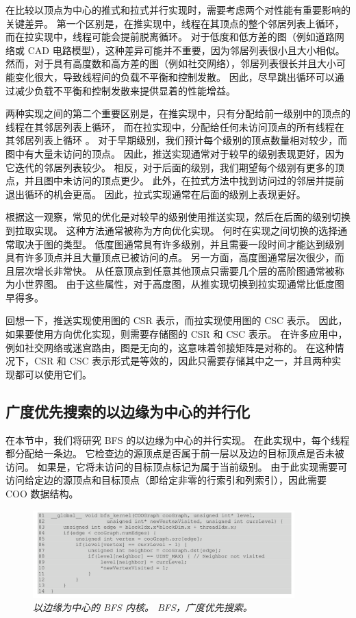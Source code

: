 在比较以顶点为中心的推式和拉式并行实现时，需要考虑两个对性能有重要影响的关键差异。 
第一个区别是，在推实现中，线程在其顶点的整个邻居列表上循环，而在拉实现中，线程可能会提前脱离循环。 
对于低度和低方差的图（例如道路网络或 CAD 电路模型），这种差异可能并不重要，因为邻居列表很小且大小相似。 
然而，对于具有高度数和高方差的图（例如社交网络），邻居列表很长并且大小可能变化很大，导致线程间的负载不平衡和控制发散。 
因此，尽早跳出循环可以通过减少负载不平衡和控制发散来提供显着的性能增益。

两种实现之间的第二个重要区别是，在推实现中，只有分配给前一级别中的顶点的线程在其邻居列表上循环，
而在拉实现中，分配给任何未访问顶点的所有线程在其邻居列表上循环 。 
对于早期级别，我们预计每个级别的顶点数量相对较少，而图中有大量未访问的顶点。 
因此，推送实现通常对于较早的级别表现更好，因为它迭代的邻居列表较少。 
相反，对于后面的级别，我们期望每个级别有更多的顶点，并且图中未访问的顶点更少。 
此外，在拉式方法中找到访问过的邻居并提前退出循环的机会更高。 因此，拉式实现通常在后面的级别上表现更好。

根据这一观察，常见的优化是对较早的级别使用推送实现，然后在后面的级别切换到拉取实现。 这种方法通常被称为方向优化实现。 
何时在实现之间切换的选择通常取决于图的类型。 
低度图通常具有许多级别，并且需要一段时间才能达到级别具有许多顶点并且大量顶点已被访问的点。 
另一方面，高度图通常层次很少，而且层次增长非常快。 从任意顶点到任意其他顶点只需要几个层的高阶图通常被称为小世界图。 
由于这些属性，对于高度图，从推实现切换到拉实现通常比低度图早得多。

回想一下，推送实现使用图的 CSR 表示，而拉实现使用图的 CSC 表示。 
因此，如果要使用方向优化实现，则需要存储图的 CSR 和 CSC 表示。 
在许多应用中，例如社交网络或迷宫路由，图是无向的，这意味着邻接矩阵是对称的。 
在这种情况下，CSR 和 CSC 表示形式是等效的，因此只需要存储其中之一，并且两种实现都可以使用它们。

\subsection{广度优先搜索的以边缘为中心的并行化}
在本节中，我们将研究 BFS 的以边缘为中心的并行实现。 
在此实现中，每个线程都分配给一条边。 它检查边的源顶点是否属于前一层以及边的目标顶点是否未被访问。 
如果是，它将未访问的目标顶点标记为属于当前级别。 
由于此实现需要可访问给定边的源顶点和目标顶点（即给定非零的行索引和列索引），因此需要 COO 数据结构。

\begin{figure}[H]
	\centering
	\includegraphics[width=0.9\textwidth]{figs/F15.10.png}
	\caption{\textit{以边缘为中心的 BFS 内核。 BFS，广度优先搜索。}}
\end{figure}

